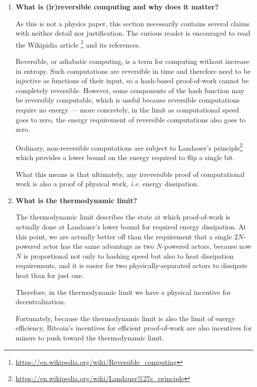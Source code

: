 \documentclass[letterpaper]{article}
\theoremstyle{xxx}
\theoremstyle{evil}
\theoremstyle{yyy}
\theoremstyle{plain}
\theoremstyle{zzz}
\begin{document}
\begin{enumerate}

\item \textbf{What is (ir)reversible computing and why does it matter?}

As this is not a physics paper, this section necessarily contains
several claims with neither detail nor justification. The curious
reader is encouraged to read the Wikipidia article
\footnote{\url{https://en.wikipedia.org/wiki/Reversible_computing}}
and its references.

Reversible, or adiabatic computing, is a term for computing without
increase in entropy. Such computations are reversible in time and
therefore need to be injective as functions of their input, so a
hash-based proof-of-work cannot be completely reversible. However,
some components of the hash function may be reversibly computable,
which is useful because reversible computations require no energy
--- more concretely, in the limit as computational speed goes to
zero, the energy requirement of reversible computations also goes
to zero.

Ordinary, non-reversible computations are subject to Landauer's
principle\footnote{\url{https://en.wikipedia.org/wiki/Landauer\%27s_principle}}
which provides a lower bound on the energy required to flip a
single bit.

What this means is that ultimately, any irreversible proof of
computational work is also a proof of physical work, \emph{i.e.}
energy dissipation.

\item \textbf{What is the thermodynamic limit?}

The thermodynamic limit describes the state at which proof-of-work
is actually done at Landauer's lower bound for required energy
dissipation. At this point, we are actually better off than the
requirement that a single $2N$-powered actor has the same advantage
as two $N$-powered actors, because now $N$ is proportional not only
to hashing speed but also to heat dissipation requirements, and it
is easier for two physically-separated actors to dissipate heat than
for just one.

Therefore, in the thermodynamic limit we have a physical incentive
for decentralization.

Fortunately, because the thermodynamic limit is also the limit of
energy efficiency, Bitcoin's incentives for efficient proof-of-work
are also incentives for miners to push toward the thermodynamic
limit.
\end{enumerate}
\end{document}
